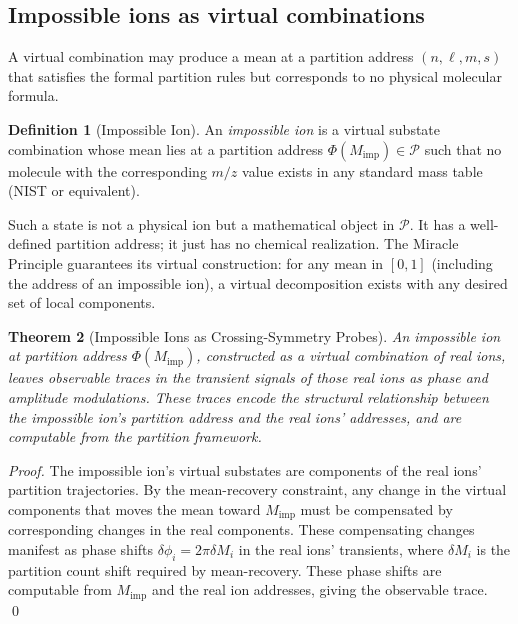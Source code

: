 \documentclass[twocolumn,10pt,a4paper]{article}
\theoremstyle{thmstyle}
\newtheorem{theorem}{Theorem}[section]
\theoremstyle{definition}
\newtheorem{definition}[theorem]{Definition}
\theoremstyle{remark}
\newcommand{\Parts}{\mathcal{P}}
\newcommand{\PhiMap}{\varPhi}
\begin{document}
\subsection{Impossible ions as virtual combinations}

A virtual combination may produce a mean at a partition address
$(n, \ell, m, s)$ that satisfies the formal partition rules but
corresponds to no physical molecular formula.

\begin{definition}[Impossible Ion]
\label{def:impossible}
An \emph{impossible ion} is a virtual substate combination whose
mean lies at a partition address $\PhiMap(M_{\text{imp}}) \in \Parts$
such that no molecule with the corresponding $m/z$ value exists in any
standard mass table (NIST or equivalent).
\end{definition}

Such a state is not a physical ion but a mathematical object in $\Parts$.
It has a well-defined partition address; it just has no chemical
realization. The Miracle Principle guarantees its virtual construction:
for any mean in $[0,1]$ (including the address of an impossible ion),
a virtual decomposition exists with any desired set of local components.

\begin{theorem}[Impossible Ions as Crossing-Symmetry Probes]
\label{thm:crossing}
An impossible ion at partition address $\PhiMap(M_{\text{imp}})$, constructed
as a virtual combination of real ions, leaves observable traces in the
transient signals of those real ions as phase and amplitude modulations.
These traces encode the structural relationship between the impossible ion's
partition address and the real ions' addresses, and are computable from
the partition framework.
\end{theorem}

\begin{proof}
The impossible ion's virtual substates are components of the real ions'
partition trajectories. By the mean-recovery constraint, any change in
the virtual components that moves the mean toward $M_{\text{imp}}$
must be compensated by corresponding changes in the real components.
These compensating changes manifest as phase shifts $\delta\phi_i =
2\pi\delta M_i$ in the real ions' transients, where $\delta M_i$ is
the partition count shift required by mean-recovery. These phase shifts
are computable from $M_{\text{imp}}$ and the real ion addresses,
giving the observable trace. \qed
\end{proof}
\end{document}
